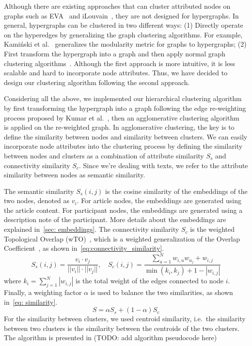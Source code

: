 Although there are existing approaches that can cluster attributed nodes on graphs such as EVA~\cite{citraro2020eva} and iLouvain~\cite{combe2015louvain}, they are not designed for hypergraphs.
In general, hypergraphs can be clustered in two different ways: 
(1) Directly operate on the hyperedges by generalizing the graph clustering algorithms.
For example, Kamiński et al.~\cite{kaminski2021hgraphcommunity} generalizes the modularity metric for graphs to hypergraphs; 
(2) First transform the hypergraph into a graph and then apply normal graph clustering algorithms~\cite{kumar2020new}.
Although the first approach is more intuitive, it is less scalable and hard to incorporate node attributes.
Thus, we have decided to design our clustering algorithm following the second approach.

Considering all the above, we implemented our hierarchical clustering algorithm by first transforming the hypergraph into a graph following the edge re-weighting process proposed by Kumar et al.~\cite{kumar2020new},
then an agglomerative clustering algorithm~\cite{steinbach2000doccluster} is applied on the re-weighted graph.
In agglomerative clustering, the key is to define the similarity between nodes and similarity between clusters.
We can easily incorporate node attributes into the clustering process by defining the similarity between nodes and clusters as a combination of attribute similarity $S_s$ and connectivity similarity $S_c$.
Since we're dealing with texts, we refer to the attribute similarity between nodes as semantic similarity. 

The semantic similarity $S_s(i, j)$ is the cosine similarity of the embeddings of the two nodes, denoted as $v_i$.
For article nodes, the embeddings are generated using the article content.
For participant nodes, the embeddings are generated using a description note of the participant.
More details about the embeddings are explained in~\autoref{sec: embeddings}.
The connectivity similarity $S_c$ is the weighted Topological Overlap (wTO)~\cite{gysi2018wto},
which is a weighted generalization of the Overlap Coefficient~\cite{vijaymeena2016survey}, as shown in~\autoref{eq:connectivity_similarity}.
\begin{equation}\label{eq:connectivity_similarity}
    S_s(i, j) = \frac{v_i \cdot v_j}{||v_i|| \cdot ||v_j||}, \quad
    S_c(i, j) = \frac{\sum_{u=1}^N{w_{i,u}w_{u_j}} + w_{i,j}}{\min(k_i, k_j) + 1 - |w_{i,j}|}
\end{equation}
where $k_i = \sum_{j=1}^N |w_{i,j}|$ is the total weight of the edges connected to node $i$.
Finally, a weighting factor $\alpha$ is used to balance the two similarities, as shown in~\autoref{eq: similarity}.
\begin{equation}\label{eq: similarity}
    S = \alpha S_s + (1-\alpha) S_c
\end{equation}
For the similarity between clusters, we used centroid similarity, i.e.\ the similarity between two clusters is the similarity between the centroids of the two clusters.
The algorithm is presented in (TODO: add algorithm pseudocode here)



